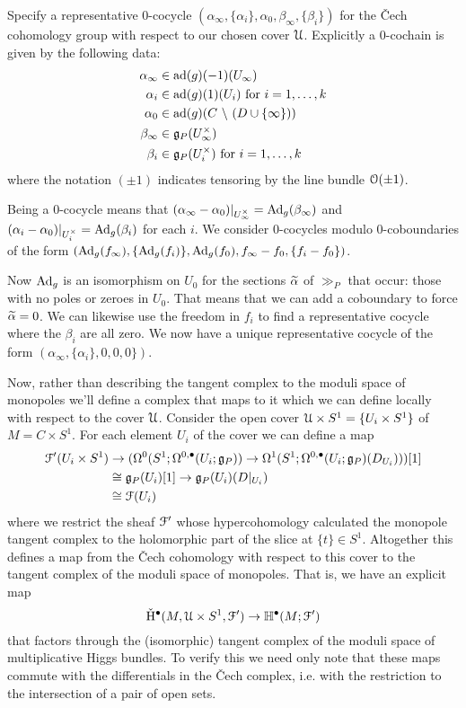 \documentclass[10pt, oneside]{article}
\renewcommand{\ad}{\mr{ad}}
\begin{document}
Specify a representative 0-cocycle $(\alpha_\infty, \{\alpha_i\}, \alpha_0, \beta_\infty, \{\beta_i\})$ for the \v Cech cohomology group with respect to our chosen cover $\mathcal{U}$.  Explicitly a 0-cochain is given by the following data:
\begin{align*}
 \alpha_\infty &\in \ad(g)(-1)(U_\infty) \\
 \alpha_i &\in \ad(g)(1)(U_i) \text{ for } i = 1,\ldots,k \\
 \alpha_0 &\in \ad(g)(C \bs (D \cup \{\infty\})) \\
 \beta_\infty &\in \gg_P(U^\times_\infty) \\
 \beta_i &\in \gg_P(U^\times_i) \text{ for } i=1,\ldots,k
\end{align*}
where the notation $(\pm 1)$ indicates tensoring by the line bundle $\mathcal{O}(\pm 1)$.

Being a 0-cocycle means that $(\alpha_\infty - \alpha_0)|_{U^\times_\infty} = \mathrm{Ad}_g(\beta_\infty)$ and $(\alpha_i - \alpha_0)|_{U^\times_i} = \mathrm{Ad}_g(\beta_i)$ for each $i$.  We consider 0-cocycles modulo 0-coboundaries of the form $(\mathrm{Ad}_g(f_\infty), \{\mathrm{Ad}_g(f_i)\}, \mathrm{Ad}_g(f_0), f_\infty -  f_0, \{f_i - f_0\})$.  

Now $\mathrm{Ad}_g$ is an isomorphism on $U_0$ for the sections $\widetilde{\alpha}$ of $\gg_P$ that occur: those with no poles or zeroes in $U_0$.  That means that we can add a coboundary to force $\widetilde{\alpha}=0$.  We can likewise use the freedom in $f_i$ to find a representative cocycle where the $\beta_i$ are all zero.  We now have a unique representative cocycle of the form $(\alpha_\infty, \{\alpha_i\}, 0,0,0\})$.

Now, rather than describing the tangent complex to the moduli space of monopoles we'll define a complex that maps to it which we can define locally with respect to the cover $\mathcal{U}$.  Consider the open cover $\mathcal{U} \times S^1 = \{U_i \times S^1\}$ of $M = C \times S^1$.  For each element $U_i$ of the cover we can define a map
\begin{align*}
\mc F'(U_i \times S^1) &\to (\Omega^0(S^1; \Omega^{0,\bullet}(U_i; \gg_P)) \to \Omega^1(S^1; \Omega^{0,\bullet}(U_i; \gg_P)(D_{U_i})))[1] \\ %
&\iso \gg_P(U_i)[1] \to \gg_P(U_i)(D|_{U_i}) \\
&\iso \mc F(U_i)
\end{align*}
where we restrict the sheaf $\mathcal{F}'$ whose hypercohomology calculated the monopole tangent complex to the holomorphic part of the slice at $\{t\} \in S^1$.  Altogether this defines a map from the \v Cech cohomology with respect to this cover to the tangent complex of the moduli space of monopoles.  That is, we have an explicit map
\[{\mathrm{\check H}}^\bullet(M, \mathcal{U} \times S^1, \mathcal{F}') \to \mathbb{H}^\bullet(M; \mathcal{F}')\]
that factors through the (isomorphic) tangent complex of the moduli space of multiplicative Higgs bundles.  To verify this we need only note that these maps commute with the differentials in the \v Cech complex, i.e. with the restriction to the intersection of a pair of open sets. 
\end{document}
